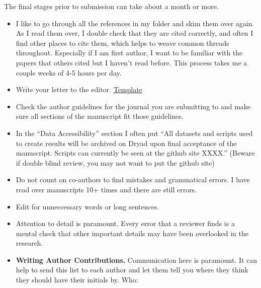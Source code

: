 \documentclass[
  letterpaper,
  DIV=11,
  numbers=noendperiod]{scrreprt}
\begin{document}
The final stages prior to submission can take about a month or more.

\begin{itemize}
\item
  I like to go through all the references in my folder and skim them
  over again. As I read them over, I double check that they are cited
  correctly, and often I find other places to cite them, which helps to
  weave common threads throughout. Especially if I am first author, I
  want to be familiar with the papers that others cited but I haven't
  read before. This process takes me a couple weeks of 4-5 hours per
  day.
\item
  Write your letter to the editor.
  \href{https://docs.google.com/document/d/1ye4hs0gYP4l4m27o9V_nPZqXD-EPNBrm9UWj-vBv_Zw/edit}{Template}
\item
  Check the author guidelines for the journal you are submitting to and
  make sure all sections of the manuscript fit those guidelines.
\item
  In the ``Data Accessibility'' section I often put ``All datasets and
  scripts used to create results will be archived on Dryad upon final
  acceptance of the manuscript. Scripts can currently be seen at the
  github site XXXX.'' (Beware if double blind review, you may not want
  to put the github site)
\item
  Do not count on co-authors to find mistakes and grammatical errors. I
  have read over manuscripts 10+ times and there are still errors.
\item
  Edit for unneccessary words or long sentences.
\item
  Attention to detail is paramount. Every error that a reviewer finds is
  a mental check that other important details may have been overlooked
  in the research.
\item
  \textbf{Writing Author Contributions.} Communication here is
  paramount. It can help to send this list to each author and let them
  tell you where they think they should have their initials by. Who:


\end{itemize}
\end{document}
